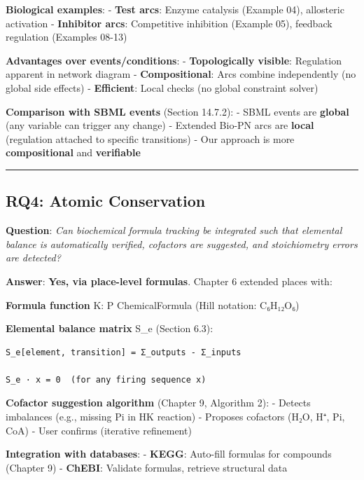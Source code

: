 \textbf{Biological examples}: - \textbf{Test arcs}: Enzyme catalysis
(Example 04), allosteric activation - \textbf{Inhibitor arcs}:
Competitive inhibition (Example 05), feedback regulation (Examples
08-13)

\textbf{Advantages over events/conditions}: - \textbf{Topologically
visible}: Regulation apparent in network diagram -
\textbf{Compositional}: Arcs combine independently (no global side
effects) - \textbf{Efficient}: Local checks (no global constraint
solver)

\textbf{Comparison with SBML events} (Section 14.7.2): - SBML events are
\textbf{global} (any variable can trigger any change) - Extended Bio-PN
arcs are \textbf{local} (regulation attached to specific transitions) -
Our approach is more \textbf{compositional} and \textbf{verifiable}

\begin{center}\rule{0.5\linewidth}{0.5pt}\end{center}

\hypertarget{rq4-atomic-conservation}{%
\subsection{RQ4: Atomic Conservation}\label{rq4-atomic-conservation}}

\textbf{Question}: \emph{Can biochemical formula tracking be integrated
such that elemental balance is automatically verified, cofactors are
suggested, and stoichiometry errors are detected?}

\textbf{Answer}: \textbf{Yes, via place-level formulas}. Chapter 6
extended places with:

\textbf{Formula function} K: P \textrightarrow ChemicalFormula (Hill notation:
C₆H₁₂O₆)

\textbf{Elemental balance matrix} S\_e (Section 6.3):

\begin{lstlisting}
S_e[element, transition] = Σ_outputs - Σ_inputs

S_e · x = 0  (for any firing sequence x)
\end{lstlisting}

\textbf{Cofactor suggestion algorithm} (Chapter 9, Algorithm 2): -
Detects imbalances (e.g., missing Pi in HK reaction) - Proposes
cofactors (H₂O, H⁺, Pi, CoA) - User confirms (iterative refinement)

\textbf{Integration with databases}: - \textbf{KEGG}: Auto-fill formulas
for compounds (Chapter 9) - \textbf{ChEBI}: Validate formulas, retrieve
structural data


